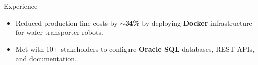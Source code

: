 \documentclass{resume} %
\begin{document}
\begin{workSection}{Experience}
	\experienceItem[
	company=Texas Instruments,
	location=Dallas{,} TX,
	position=Information Technology Intern,
	duration= May 2024 - August 2024,
	]
	\begin{itemize}
		\vspace{-0.5em}
		\itemsep -6pt {}
		\item Reduced production line costs by \textbf{$\sim$34\%} by deploying \textbf{Docker} infrastructure for wafer transporter robots.
		\item Met with {10+} stakeholders to configure \textbf{Oracle SQL} databases, {REST APIs}, and documentation.
	\end{itemize}
	
	\experienceItem[
	company=GNOME Foundation,
	location=Remote,
	position=Open-Source Contributor,
	duration=December 2023 {-} June 2024
	]
	\begin{itemize}
		\vspace{-0.5em}
		\itemsep -6pt {}


\end{itemize}
\end{workSection}
\end{document}
